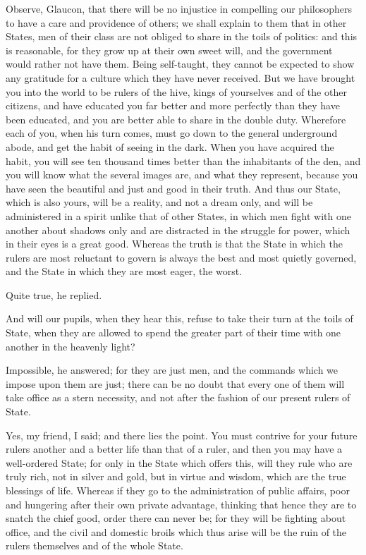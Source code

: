 Observe, Glaucon, that there will be no injustice in compelling our
philosophers to have a care and providence of others; we shall explain
to them that in other States, men of their class are not obliged to
share in the toils of politics: and this is reasonable, for they grow up
at their own sweet will, and the government would rather not have them.
Being self-taught, they cannot be expected to show any gratitude for a
culture which they have never received. But we have brought you into
the world to be rulers of the hive, kings of yourselves and of the other
citizens, and have educated you far better and more perfectly than they
have been educated, and you are better able to share in the double duty.
Wherefore each of you, when his turn comes, must go down to the general
underground abode, and get the habit of seeing in the dark. When you
have acquired the habit, you will see ten thousand times better than the
inhabitants of the den, and you will know what the several images are,
and what they represent, because you have seen the beautiful and just
and good in their truth. And thus our State, which is also yours, will
be a reality, and not a dream only, and will be administered in a spirit
unlike that of other States, in which men fight with one another about
shadows only and are distracted in the struggle for power, which in
their eyes is a great good. Whereas the truth is that the State in which
the rulers are most reluctant to govern is always the best and most
quietly governed, and the State in which they are most eager, the worst.

Quite true, he replied.

And will our pupils, when they hear this, refuse to take their turn at
the toils of State, when they are allowed to spend the greater part of
their time with one another in the heavenly light?

Impossible, he answered; for they are just men, and the commands which
we impose upon them are just; there can be no doubt that every one of
them will take office as a stern necessity, and not after the fashion of
our present rulers of State.

Yes, my friend, I said; and there lies the point. You must contrive for
your future rulers another and a better life than that of a ruler, and
then you may have a well-ordered State; for only in the State which
offers this, will they rule who are truly rich, not in silver and gold,
but in virtue and wisdom, which are the true blessings of life. Whereas
if they go to the administration of public affairs, poor and hungering
after their own private advantage, thinking that hence they are to
snatch the chief good, order there can never be; for they will be
fighting about office, and the civil and domestic broils which thus
arise will be the ruin of the rulers themselves and of the whole State.

